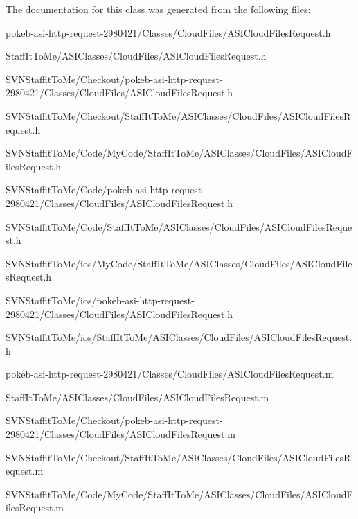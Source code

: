 \-The documentation for this class was generated from the following files\-:\begin{DoxyCompactItemize}
\item 
pokeb-\/asi-\/http-\/request-\/2980421/\-Classes/\-Cloud\-Files/\-A\-S\-I\-Cloud\-Files\-Request.\-h\item 
\-Staff\-It\-To\-Me/\-A\-S\-I\-Classes/\-Cloud\-Files/\-A\-S\-I\-Cloud\-Files\-Request.\-h\item 
\-S\-V\-N\-Staffit\-To\-Me/\-Checkout/pokeb-\/asi-\/http-\/request-\/2980421/\-Classes/\-Cloud\-Files/\-A\-S\-I\-Cloud\-Files\-Request.\-h\item 
\-S\-V\-N\-Staffit\-To\-Me/\-Checkout/\-Staff\-It\-To\-Me/\-A\-S\-I\-Classes/\-Cloud\-Files/\-A\-S\-I\-Cloud\-Files\-Request.\-h\item 
\-S\-V\-N\-Staffit\-To\-Me/\-Code/\-My\-Code/\-Staff\-It\-To\-Me/\-A\-S\-I\-Classes/\-Cloud\-Files/\-A\-S\-I\-Cloud\-Files\-Request.\-h\item 
\-S\-V\-N\-Staffit\-To\-Me/\-Code/pokeb-\/asi-\/http-\/request-\/2980421/\-Classes/\-Cloud\-Files/\-A\-S\-I\-Cloud\-Files\-Request.\-h\item 
\-S\-V\-N\-Staffit\-To\-Me/\-Code/\-Staff\-It\-To\-Me/\-A\-S\-I\-Classes/\-Cloud\-Files/\-A\-S\-I\-Cloud\-Files\-Request.\-h\item 
\-S\-V\-N\-Staffit\-To\-Me/ios/\-My\-Code/\-Staff\-It\-To\-Me/\-A\-S\-I\-Classes/\-Cloud\-Files/\-A\-S\-I\-Cloud\-Files\-Request.\-h\item 
\-S\-V\-N\-Staffit\-To\-Me/ios/pokeb-\/asi-\/http-\/request-\/2980421/\-Classes/\-Cloud\-Files/\-A\-S\-I\-Cloud\-Files\-Request.\-h\item 
\-S\-V\-N\-Staffit\-To\-Me/ios/\-Staff\-It\-To\-Me/\-A\-S\-I\-Classes/\-Cloud\-Files/\-A\-S\-I\-Cloud\-Files\-Request.\-h\item 
pokeb-\/asi-\/http-\/request-\/2980421/\-Classes/\-Cloud\-Files/\-A\-S\-I\-Cloud\-Files\-Request.\-m\item 
\-Staff\-It\-To\-Me/\-A\-S\-I\-Classes/\-Cloud\-Files/\-A\-S\-I\-Cloud\-Files\-Request.\-m\item 
\-S\-V\-N\-Staffit\-To\-Me/\-Checkout/pokeb-\/asi-\/http-\/request-\/2980421/\-Classes/\-Cloud\-Files/\-A\-S\-I\-Cloud\-Files\-Request.\-m\item 
\-S\-V\-N\-Staffit\-To\-Me/\-Checkout/\-Staff\-It\-To\-Me/\-A\-S\-I\-Classes/\-Cloud\-Files/\-A\-S\-I\-Cloud\-Files\-Request.\-m\item 
\-S\-V\-N\-Staffit\-To\-Me/\-Code/\-My\-Code/\-Staff\-It\-To\-Me/\-A\-S\-I\-Classes/\-Cloud\-Files/\-A\-S\-I\-Cloud\-Files\-Request.\-m\item 

\end{DoxyCompactItemize}

